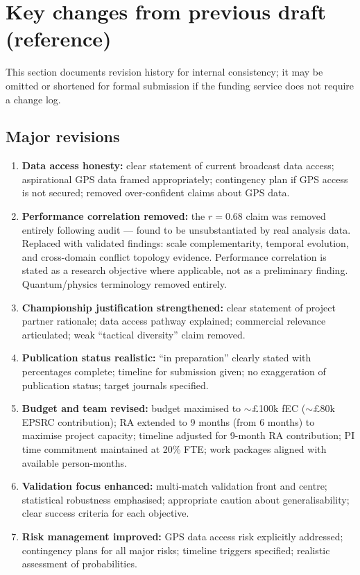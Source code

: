 \section{Key changes from previous draft (reference)}

This section documents revision history for internal consistency; it may be omitted or shortened for formal submission if the funding service does not require a change log.

\subsection{Major revisions}

\begin{enumerate}[label=\arabic*.]
  \item \textbf{Data access honesty:} clear statement of current broadcast data access; aspirational GPS data framed appropriately; contingency plan if GPS access is not secured; removed over-confident claims about GPS data.

  \item \textbf{Performance correlation removed:} the $r = 0.68$ claim was removed entirely following audit --- found to be unsubstantiated by real analysis data. Replaced with validated findings: scale complementarity, temporal evolution, and cross-domain conflict topology evidence. Performance correlation is stated as a research objective where applicable, not as a preliminary finding. Quantum/physics terminology removed entirely.

  \item \textbf{Championship justification strengthened:} clear statement of project partner rationale; data access pathway explained; commercial relevance articulated; weak ``tactical diversity'' claim removed.

  \item \textbf{Publication status realistic:} ``in preparation'' clearly stated with percentages complete; timeline for submission given; no exaggeration of publication status; target journals specified.

  \item \textbf{Budget and team revised:} budget maximised to $\sim$\pounds100k fEC ($\sim$\pounds80k EPSRC contribution); RA extended to 9 months (from 6 months) to maximise project capacity; timeline adjusted for 9-month RA contribution; PI time commitment maintained at 20\% FTE; work packages aligned with available person-months.

  \item \textbf{Validation focus enhanced:} multi-match validation front and centre; statistical robustness emphasised; appropriate caution about generalisability; clear success criteria for each objective.

  \item \textbf{Risk management improved:} GPS data access risk explicitly addressed; contingency plans for all major risks; timeline triggers specified; realistic assessment of probabilities.
\end{enumerate}

